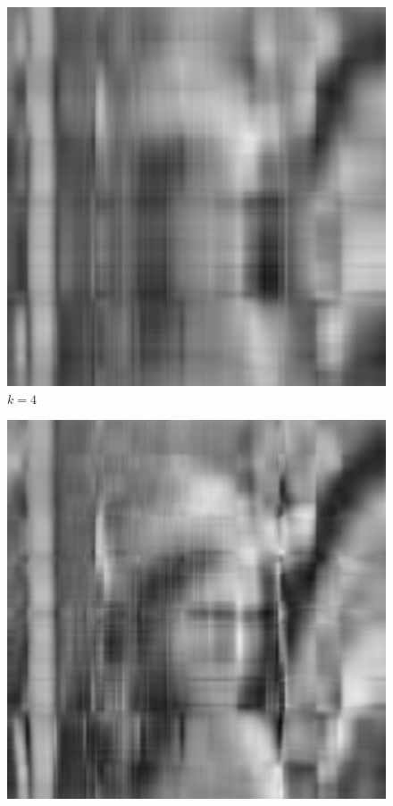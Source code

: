 \documentclass[10pt]{article}
\begin{document}
\begin{enumerate}[label=3.\arabic*]
\begin{figure}[H]
\begin{minipage}[c]{0.45\textwidth}
    		\includegraphics[width=1\textwidth]{SVD/k = 4.png}
    		\caption{$k=4$}
    	\end{minipage}
    \end{figure}
 	\begin{figure}[H]
		\centering
		\begin{minipage}[c]{0.45\textwidth} 
			\centering
			\includegraphics[width=1\textwidth]{SVD/k = 8.png}

\end{minipage}
\end{figure}
\end{enumerate}
\end{document}
